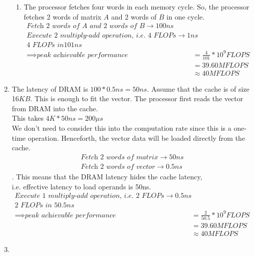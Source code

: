 \documentclass{article}
\begin{document}
\begin{enumerate}[label=\Large\textbf{\arabic*}.]
\begin{enumerate}[label={\arabic*}.]
	\item
	The processor fetches four words in each memory cycle. So, the processor fetches 2 words of matrix $A$ and 2 words of $B$ in one cycle.
	\begin{align*}
		\textit{Fetch 2 words of A and 2 words of B} \to 100ns
		\\\textit{Execute 2 multiply-add operation, i.e. 4 FLOPs} \to 1ns
		\\\textit{4 FLOPs in} 101ns
		\\\implies \textit{peak achievable performance} &= \frac{4}{101} * 10^9 FLOPS
		\\&= 39.60 MFLOPS 
		\\&\approx 40 MFLOPS
	\end{align*}
	
	
\end{enumerate}

\item
	The latency of DRAM is $100 * 0.5 ns = 50 ns$.
	Assume that the cache is of size 16$KB$. This is enough to fit the vector.
	The processor first reads the vector from DRAM into the cache.
	\\ This takes $4K * 50 ns = 200 \mu	s$
	\\ We don't need to consider this into the computation rate since this is a one-time operation. Henceforth, the vector data will be loaded directly from the cache. 
	\begin{align*}
		\textit{Fetch 2 words of matrix} \to 50ns
		\\\textit{Fetch 2 words of vector} \to 0.5 ns
	\end{align*}
	. 
	This means that the DRAM latency hides the cache latency, 
	\\i.e. effective latency to load operands is 50ns.
	\begin{align*}
		\textit{Execute 1 multiply-add operation, i.e. 2 FLOPs} \to 0.5ns
		\\\textit{2 FLOPs in } 50.5ns
		\\\implies \textit{peak achievable performance} &= \frac{2}{50.5} * 10^9 FLOPS
		\\&= 39.60 MFLOPS 
		\\&\approx 40 MFLOPS
	\end{align*}

\item
	
\end{enumerate}
\end{document}
